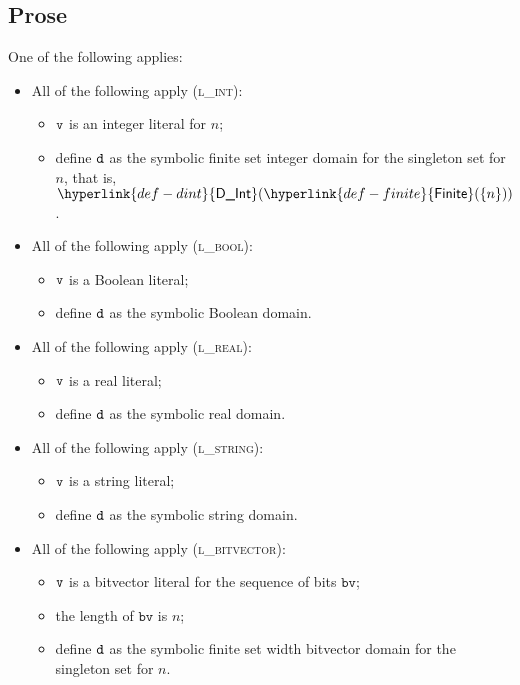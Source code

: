 \documentclass{book}
\newcommand\DInt[0]{\hyperlink{def-dint}{\textsf{D\_Int}}}
\newcommand\Finite[0]{\hyperlink{def-finite}{\textsf{Finite}}}
\newcommand\bv[0]{\texttt{bv}}
\begin{document}
\subsection{Prose}
One of the following applies:
\begin{itemize}
  \item All of the following apply (\textsc{l\_int}):
  \begin{itemize}
    \item $\texttt{v}$ is an integer literal for $n$;
    \item define $\texttt{d}$ as the symbolic finite set integer domain for the singleton set for $n$, that is, $\DInt(\Finite(\{n\}))$.
  \end{itemize}

  \item All of the following apply (\textsc{l\_bool}):
  \begin{itemize}
    \item $\texttt{v}$ is a Boolean literal;
    \item define $\texttt{d}$ as the symbolic Boolean domain.
  \end{itemize}

  \item All of the following apply (\textsc{l\_real}):
  \begin{itemize}
    \item $\texttt{v}$ is a real literal;
    \item define $\texttt{d}$ as the symbolic real domain.
  \end{itemize}

  \item All of the following apply (\textsc{l\_string}):
  \begin{itemize}
    \item $\texttt{v}$ is a string literal;
    \item define $\texttt{d}$ as the symbolic string domain.
  \end{itemize}

  \item All of the following apply (\textsc{l\_bitvector}):
  \begin{itemize}
    \item $\texttt{v}$ is a bitvector literal for the sequence of bits $\bv$;
    \item the length of $\bv$ is $n$;
    \item define $\texttt{d}$ as the symbolic finite set width bitvector domain for the singleton set for $n$.
  \end{itemize}
\end{itemize}
\end{document}
